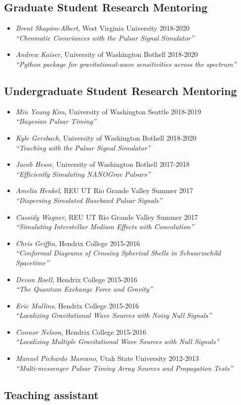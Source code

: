 \documentclass[11pt,letterpaper,sans,unicode]{moderncv}
\newcommand{\studentitem}[4]{\item \textit{#1}, {#2} \hfill{#3} \\ \textit{``#4''} } %
\newcommand{\blucirc}{{\color{color1} $\circ\;\;$}}
\begin{document}
\subsection{Graduate Student Research Mentoring}
\renewcommand\labelitemi{\blucirc}
\begin{itemize}[leftmargin=8mm]
	\studentitem{Brent Shapiro-Albert}{West Virginia University}{2018-2020}{Chromatic Covariances with the Pulsar Signal Simulator}
	\studentitem{Andrew Kaiser}{University of Washington Bothell}{2018-2020}{Python package for gravitational-wave sensitivities across the spectrum}

\end{itemize}


\subsection{Undergraduate Student Research Mentoring}
\renewcommand\labelitemi{\blucirc}
\begin{itemize}[leftmargin=8mm]
	\studentitem{Min Young Kim}{University of Washington Seattle}{2018-2019}{Bayesian Pulsar Timing}
	\studentitem{Kyle Gersbach}{University of Washington Bothell}{2018-2020}{Teaching with the Pulsar Signal Simulator}
	\studentitem{Jacob Hesse}{University of Washington Bothell}{2017-2018}{Efficiently Simulating NANOGrav Pulsars}
	\studentitem{Amelia Henkel}{REU UT Rio Grande Valley}{Summer 2017}{Dispersing Simulated Baseband Pulsar Signals}
	\studentitem{Cassidy Wagner}{REU UT Rio Grande Valley}{Summer 2017}{Simulating Interstellar Medium Effects with Convolution}
       	 \studentitem{Chris Griffin}{Hendrix College}{2015-2016}{Conformal Diagrams of Crossing Spherical Shells in Schwarzschild Spacetime}
      	\studentitem{Devon Roell}{Hendrix College}{2015-2016}{The Quantum Exchange Force and Gravity}
	\studentitem{Eric Mullins}{Hendrix College}{2015-2016}{Localizing Gravitational Wave Sources with Noisy Null Signals}
	\studentitem{Connor Nelson}{Hendrix College}{2015-2016}{Localizing Multiple Gravitational Wave Sources with Null Signals}
        	\studentitem{Manuel Pichardo Marcano}{Utah State University}{2012-2013}{Multi-messenger Pulsar Timing Array Sources and Propagation Tests}
\end{itemize}

\subsection{Teaching assistant}
\end{document}
